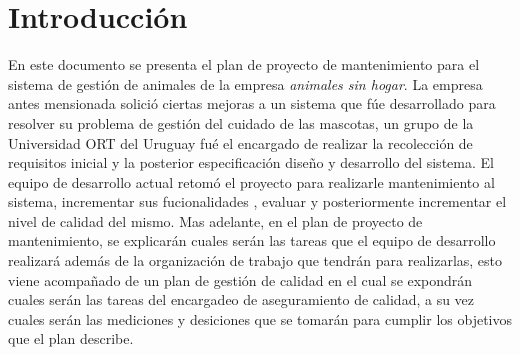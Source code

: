 \section{Introducción}
En este documento se presenta el plan de proyecto de mantenimiento para el sistema de gestión de animales de la empresa \textit{animales sin hogar}.
La empresa antes mensionada solició ciertas mejoras a un sistema que fúe desarrollado para resolver su problema de gestión del cuidado de las mascotas, un grupo de la Universidad ORT del Uruguay fué el encargado de realizar la recolección de requisitos inicial y la posterior especificación diseño y desarrollo del sistema.
El equipo de desarrollo actual retomó el proyecto para realizarle mantenimiento al sistema, incrementar sus fucionalidades , evaluar y posteriormente incrementar el nivel de calidad del mismo.
Mas adelante, en el plan de proyecto de mantenimiento, se explicarán cuales serán las tareas que el equipo de desarrollo realizará además de la organización de trabajo que tendrán para realizarlas, esto viene acompañado de un plan de gestión de calidad en el cual se expondrán cuales serán las tareas del encargadeo de aseguramiento de calidad, a su vez cuales serán las mediciones y desiciones que se tomarán para cumplir los objetivos que el plan describe.


\begin{comment}
\section{Análisis}
Al momento de compilar el software, encontramos que no es posible hacerlo, analizando el error encontrado podemos solucionarlo simplemente agregando un constructor por defecto en la ventana principal de inicio

\section{Introducción}
El presente documento especifica el acuerdo de trabajo entre … y entre…

Describir que se plantean los objetivos del proyecto, el alcance del proyecto y el alcance de los productos y servicios.

Indicar que se detalla metodología de trabajo, cronograma, entregables organización, etc.

Máximo: media página.
\end{comment}
